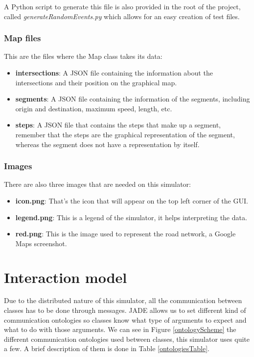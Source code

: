 A Python script to generate this file is also provided in the root of the project, called \emph{generateRandomEvents.py} which allows for an easy creation of test files.

\subsubsection{Map files}

This are the files where the Map class takes its data:

\begin{itemize}
\item \textbf{intersections}: A JSON file containing the information about the intersections and their position on the graphical map.
\item \textbf{segments}: A JSON file containing the information of the segments, including origin and destination, maximum speed, length, etc.
\item \textbf{steps}: A JSON file that contains the steps that make up a segment, remember that the steps are the graphical representation of the segment, whereas the segment does not have a representation by itself.
\end{itemize}

\subsubsection{Images}

There are also three images that are needed on this simulator:

\begin{itemize}
\item \textbf{icon.png}: That's the icon that will appear on the top left corner of the GUI.
\item \textbf{legend.png}: This is a legend of the simulator, it helps interpreting the data.
\item \textbf{red.png}: This is the image used to represent the road network, a Google Maps screenshot.
\end{itemize}

\section{Interaction model}

Due to the distributed nature of this simulator, all the communication between classes has to be done through messages. JADE allows us to set different kind of communication ontologies so classes know what type of arguments to expect and what to do with those arguments. We can see in Figure \ref{ontologyScheme} the different communication ontologies used between classes, this simulator uses quite a few. A brief description of them is done in Table \ref{ontologiesTable}.

